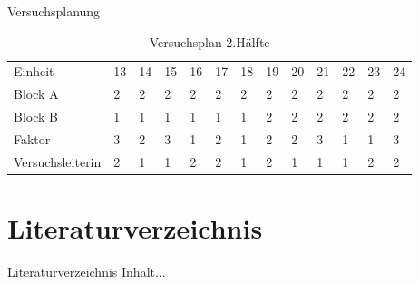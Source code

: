 \documentclass[ ngerman, fontsize= 10pt, headings=big, titlepage=true]{beamer}
\begin{document}
\begin{frame}{Versuchsplanung}
	
{\small
\begin{table}[hb]
	\caption{Versuchsplan 2.Hälfte}
	\centering
	\begin{tabular}[b]{l||l|l|l|l|l|l|l|l|l|l|l|l}
		\hline
		Einheit & 13 & 14 & 15 & 16 & 17 & 18 & 19 & 20 & 21 & 22 & 23 & 24\\
		\hhline{=============}
		Block A & 2 & 2 & 2 & 2 & 2 & 2 & 2 & 2 & 2 & 2 & 2 & 2\\
		\hline
		Block B & 1 & 1 & 1 & 1 & 1 & 1 & 2 & 2 & 2 & 2 & 2 & 2\\
		\hline
		Faktor & 3 & 2 & 3 & 1 & 2 & 1 & 2 & 2 & 3 & 1 & 1 & 3\\
		\hhline{=============}
		{\tiny Versuchsleiterin} & 2 & 1 & 1 & 2 & 2 & 1 & 2 & 1 & 1 & 1 & 2 & 2\\
		\hline
	\end{tabular}
\end{table}}


\end{frame}



\section{Literaturverzeichnis}
\begin{frame}{Literaturverzeichnis}
	Inhalt...
\end{frame}
\end{document}
